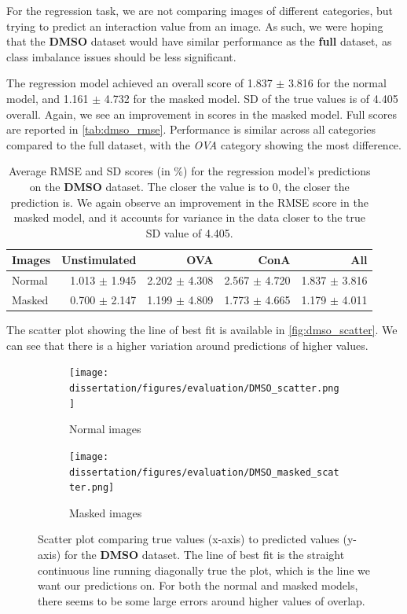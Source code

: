 For the regression task, we are not comparing images of different categories, but trying to predict an interaction value from an image. As such, we were hoping that the \textbf{DMSO} dataset would have similar performance as the \textbf{full} dataset, as class imbalance issues should be less significant.

The regression model achieved an overall score of 1.837 $\pm$ 3.816 for the normal model, and 1.161 $\pm$ 4.732 for the masked model. SD of the true values is of 4.405 overall. Again, we see an improvement in scores in the masked model. Full scores are reported in \autoref{tab:dmso_rmse}. Performance is similar across all categories compared to the full dataset, with the \textit{OVA} category showing the most difference.

\begin{table}[h!]
\centering
\caption{Average RMSE and SD scores (in \%) for the regression model's predictions on the \textbf{DMSO} dataset. The closer the value is to 0, the closer the prediction is. We again observe an improvement in the RMSE score in the masked model, and it accounts for variance in the data closer to the true SD value of 4.405.}
\label{tab:dmso_rmse}
\begin{tabular}{l|rrr|r}
\rowcolor[HTML]{EFEFEF}
\textbf{Images} & \cellcolor[HTML]{FFCCC9}\textbf{Unstimulated} & \cellcolor[HTML]{C9FFCB}\textbf{OVA} & \cellcolor[HTML]{96FFFB}\textbf{ConA} & \textbf{All} \\ \hline
Normal      & 1.013 $\pm$ 1.945  & 2.202 $\pm$ 4.308   & 2.567 $\pm$ 4.720  &   1.837 $\pm$ 3.816  \\ \hline
Masked      &    0.700 $\pm$ 2.147          & 1.199 $\pm$ 4.809  &  1.773 $\pm$ 4.665   &   1.179 $\pm$ 4.011
\end{tabular}
\end{table}

The scatter plot showing the line of best fit is available in \autoref{fig:dmso_scatter}. We can see that there is a higher variation around predictions of higher values.

\begin{figure}[h!]
    \centering
    \begin{subfigure}{0.8\textwidth}
        \texttt{[image: dissertation/figures/evaluation/DMSO\_scatter.png]}
        \caption{Normal images}
    \end{subfigure}
    \begin{subfigure}{0.8\textwidth}
        \texttt{[image: dissertation/figures/evaluation/DMSO\_masked\_scatter.png]}
        \caption{Masked images}
    \end{subfigure}
    \caption{Scatter plot comparing true values (x-axis) to predicted values (y-axis) for the \textbf{DMSO} dataset. The line of best fit is the straight continuous line running diagonally true the plot, which is the line we want our predictions on. For both the normal and masked models, there seems to be some large errors around higher values of overlap.}
    \label{fig:dmso_scatter}
\end{figure}

